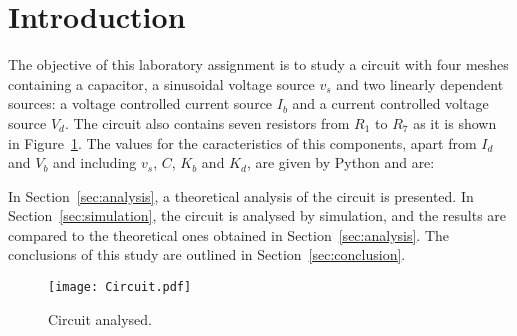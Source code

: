 \section{Introduction}
\label{sec:introduction}

The objective of this laboratory assignment is to study a circuit with four meshes containing a capacitor, a sinusoidal voltage source $v_s$ and two linearly dependent sources: a voltage controlled current source $I_b$ and a current controlled voltage source $V_d$. The circuit also contains seven resistors from $R_1$ to $R_7$ as it is shown in Figure~\ref{fig:Circuit_Base}.
The values for the caracteristics of this components, apart from $I_d$ and $V_b$ and including $v_s$, $C$, $K_b$ and $K_d$, are given by Python and are:

%    

In Section~\ref{sec:analysis}, a theoretical analysis of the circuit is
presented. In Section~\ref{sec:simulation}, the circuit is analysed by
simulation, and the results are compared to the theoretical ones obtained in
Section~\ref{sec:analysis}. The conclusions of this study are outlined in
Section~\ref{sec:conclusion}.

\begin{figure}[h] \centering
\texttt{[image: Circuit.pdf]}
\caption{Circuit analysed.}
\label{fig:Circuit_Base}
\end{figure}